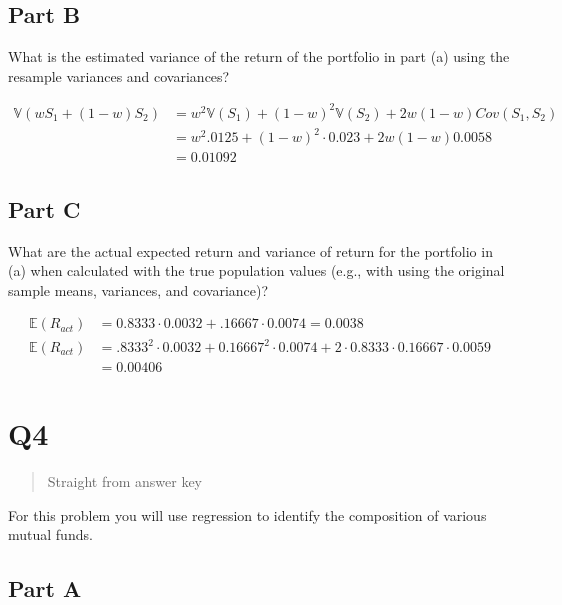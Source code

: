 \documentclass[
  oneside]{book}
\begin{document}
\hypertarget{part-b-9}{%
\subsection{Part B}\label{part-b-9}}

What is the estimated variance of the return of the portfolio in part (a) using the resample variances and covariances?

\[
\begin{aligned}
\mathbb{V}(wS_{1}+(1-w)S_{2}) &= w^{2}\mathbb{V}(S_{1})+(1-w)^{2}\mathbb{V}(S_{2})+2w(1-w)Cov(S_{1},S_{2})\\
&= w^{2}.0125 + (1-w)^{2}\cdot 0.023 + 2w(1-w)0.0058\\
&= 0.01092
\end{aligned}
\]

\hypertarget{part-c-4}{%
\subsection{Part C}\label{part-c-4}}

What are the actual expected return and variance of return for the portfolio in (a) when calculated with the true population values (e.g., with using the original sample means, variances, and covariance)?

\[
\begin{aligned}
\mathbb{E}(R_{act}) &= 0.8333 \cdot 0.0032 + .16667\cdot 0.0074 = 0.0038\\
\mathbb{E}(R_{act}) &= .8333^2 \cdot 0.0032+0.16667^{2}\cdot 0.0074 + 2\cdot 0.8333 \cdot 0.16667 \cdot 0.0059\\
&=0.00406
\end{aligned}
\]

\hypertarget{q4-3}{%
\section{Q4}\label{q4-3}}

\begin{quote}
Straight from answer key
\end{quote}

For this problem you will use regression to identify the composition of various mutual
funds.

\hypertarget{part-a-10}{%
\subsection{Part A}\label{part-a-10}}
\end{document}
